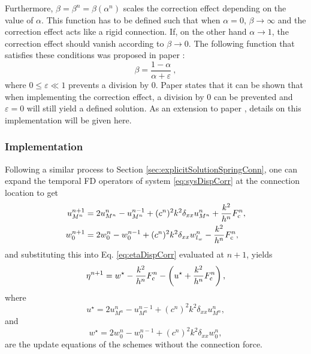 Furthermore, $\beta = \beta^n = \beta(\alpha^n)$ scales the correction effect depending on the value of $\alpha$. This function has to be defined such that when $\alpha = 0$, $\beta\rightarrow \infty$ and the correction effect acts like a rigid connection. If, on the other hand $\alpha \rightarrow 1$, the correction effect should vanish according to $\beta \rightarrow 0$. The following function that satisfies these conditions was proposed in paper \citeP[G]:
\begin{equation}\label{eq:betaDef}
    \beta  = \frac{1-\alpha}{\alpha + \varepsilon}\ ,
\end{equation}
where $0\leq\varepsilon \ll 1$ prevents a division by 0. Paper \citeP[G] states that it can be shown that when implementing the correction effect, a division by 0 can be prevented and $\varepsilon = 0$ will still yield a defined solution. As an extension to paper \citeP[G], details on this implementation will be given here.

\subsubsection{Implementation}
Following a similar process to Section \ref{sec:explicitSolutionSpringConn}, one can expand the temporal FD operators of system \eqref{eq:sysDispCorr} at the connection location to get
\begin{subequations}\label{eq:sysDispCorrNp1}
    \begin{align}
        u_{M^n}^{n+1} &= 2u_{M^n}^{n} - u_{M^n}^{n-1} + (c^n)^2k^2\delta_{xx}u_{M^n}^{n}+ \frac{k^2}{h^n}
        F_\text{c}^n,\\
        w_{0}^{n+1} &= 2w_{0}^{n} - w_0^{n-1} + (c^n)^2k^2\delta_{xx}w_{l_w}^n - \frac{k^2}{h^n}
        F_\text{c}^n,
    \end{align}
\end{subequations}
and substituting this into Eq. \eqref{eq:etaDispCorr} evaluated at $n+1$, yields
\begin{equation}\label{eq:etaNextDispCorr1}
    \eta^{n+1} = w^\star-\frac{k^2}{h^n}F_{\text{c}}^n-\left(u^\star+\frac{k^2}{h^n}F_{\text{c}}^n\right),
\end{equation}
where 
\begin{equation*}
    u^\star = 2u_{M^n}^{n} - u_{M^n}^{n-1} + (c^n)^2k^2\delta_{xx}u_{M^n}^{n},
\end{equation*} 
and 
\begin{equation*}
    w^\star = 2w_{0}^{n} - w_0^{n-1} + (c^n)^2k^2\delta_{xx}w_0^n ,
\end{equation*}
are the update equations of the schemes without the connection force. 

